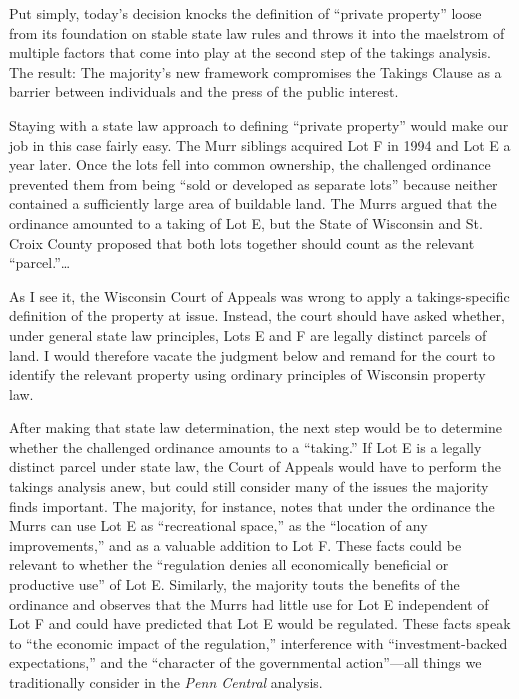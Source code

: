 Put simply, today's decision knocks the definition of ``private property'' loose
from its foundation on stable state law rules and throws it into the maelstrom
of multiple factors that come into play at the second step of the takings
analysis. The result: The majority's new framework compromises the Takings
Clause as a barrier between individuals and the press of the public interest.



Staying with a state law approach to defining ``private property'' would make
our job in this case fairly easy. The Murr siblings acquired Lot F in 1994 and
Lot E a year later. Once the lots fell into common ownership, the challenged
ordinance prevented them from being ``sold or developed as separate lots''
because neither contained a sufficiently large area of buildable land. The Murrs
argued that the ordinance amounted to a taking of Lot E, but the State of
Wisconsin and St. Croix County proposed that both lots together should count as
the relevant ``parcel.''\ldots

As I see it, the Wisconsin Court of Appeals was wrong to apply a
takings-specific definition of the property at issue. Instead, the court should
have asked whether, under general state law principles, Lots E and F are legally
distinct parcels of land. I would therefore vacate the judgment below and remand
for the court to identify the relevant property using ordinary principles of
Wisconsin property law.

After making that state law determination, the next step would be to determine
whether the challenged ordinance amounts to a ``taking.'' If Lot E is a legally
distinct parcel under state law, the Court of Appeals would have to perform the
takings analysis anew, but could still consider many of the issues the majority
finds important. The majority, for instance, notes that under the ordinance the
Murrs can use Lot E as ``recreational space,'' as the ``location of any
improvements,'' and as a valuable addition to Lot F. These facts could be
relevant to whether the ``regulation denies all economically beneficial or
productive use'' of Lot E. Similarly, the majority touts the benefits of the
ordinance and observes that the Murrs had little use for Lot E independent of
Lot F and could have predicted that Lot E would be regulated. These facts speak
to ``the economic impact of the regulation,'' interference with
``investment-backed expectations,'' and the ``character of the governmental
action''---all things we traditionally consider in the \textit{Penn Central}
analysis.

